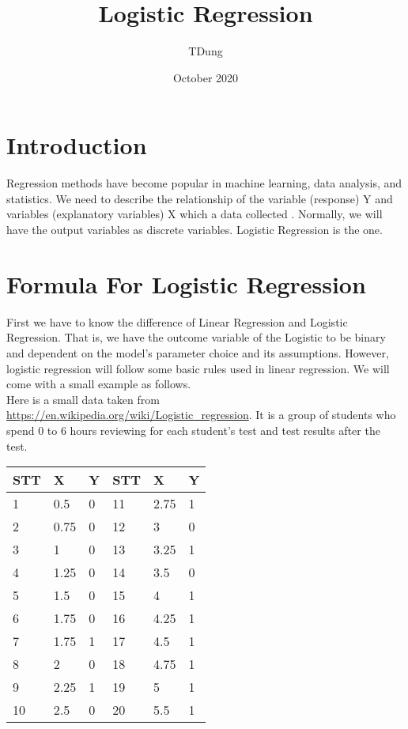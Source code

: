\documentclass{article}
\title{Logistic Regression}
\author{TDung}
\date{October 2020}
\begin{document}
\maketitle  

\section{Introduction}
    Regression methods have become popular in machine learning, data analysis, and statistics. We need to describe the relationship of the variable (response) Y and variables (explanatory variables) X which a data collected . Normally, we will have the output variables as discrete variables. Logistic Regression is the one.
\section{Formula For Logistic Regression} 
    First we have to know the difference of Linear Regression and Logistic Regression. That is, we have the outcome variable of the Logistic to be binary and dependent on the model's parameter choice and its assumptions. However, logistic regression will follow some basic rules used in linear regression. We will come with a small example as follows.
    \\
    Here is a small data taken from \url{https://en.wikipedia.org/wiki/Logistic_regression}. It is a group of students who spend 0 to 6 hours reviewing for each student's test and test results after the test.
    \\
    \begin{center} 
        \begin{tabular}{|l|l|l|l|l|l|}
        \hline
        STT & X    & Y          & STT & X    & Y \\ \hline
        1   & 0.5  & 0          & 11  & 2.75 & 1 \\ \hline
        2   & 0.75 & 0          & 12  & 3    & 0 \\ \hline
        3   & 1    & 0          & 13  & 3.25 & 1 \\ \hline
        4   & 1.25 & 0          & 14  & 3.5  & 0 \\ \hline
        5   & 1.5  & 0          & 15  & 4    & 1 \\ \hline
        6   & 1.75 & 0          & 16  & 4.25 & 1 \\ \hline
        7   & 1.75 & 1          & 17  & 4.5  & 1 \\ \hline
        8   & 2    & 0          & 18  & 4.75 & 1 \\ \hline
        9   & 2.25 & 1          & 19  & 5    & 1 \\ \hline
        10  & 2.5  & 0          & 20  & 5.5  & 1 \\ \hline
        \end{tabular}
    \end{center}
\end{document}
